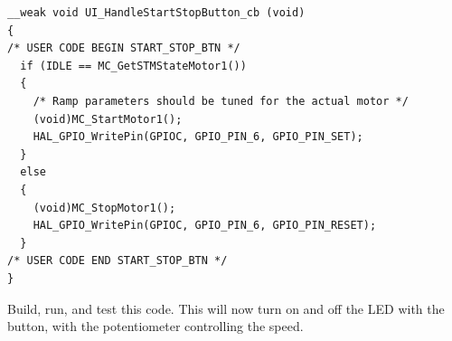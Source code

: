 \documentclass[10pt]{article}
\begin{document}
            \begin{verbatim}
__weak void UI_HandleStartStopButton_cb (void)
{
/* USER CODE BEGIN START_STOP_BTN */
  if (IDLE == MC_GetSTMStateMotor1())
  {
    /* Ramp parameters should be tuned for the actual motor */
    (void)MC_StartMotor1();
    HAL_GPIO_WritePin(GPIOC, GPIO_PIN_6, GPIO_PIN_SET);
  }
  else
  {
    (void)MC_StopMotor1();
    HAL_GPIO_WritePin(GPIOC, GPIO_PIN_6, GPIO_PIN_RESET);
  }
/* USER CODE END START_STOP_BTN */
}
            \end{verbatim}
            Build, run, and test this code. This will now turn on and off the LED with the button, with the potentiometer controlling the speed.         
\end{document}
